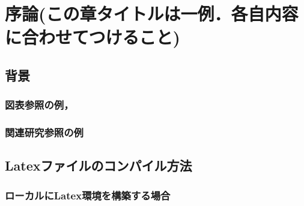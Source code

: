 \documentclass[12pt,a4j]{jreport}
\begin{document}



\chapter{序論(この章タイトルは一例．各自内容に合わせてつけること)}

\section{背景}


\subsection{図表参照の例，}


\subsection{関連研究参照の例}

\section{Latexファイルのコンパイル方法}

\subsection{ローカルにLatex環境を構築する場合}
\end{document}
